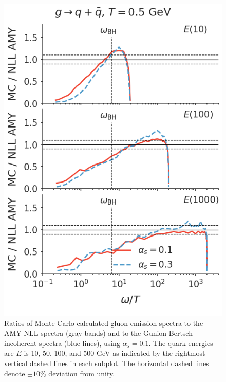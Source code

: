 \documentclass[aps, prc, reprint, amsmath, groupedaddress, nofootinbib]{revtex4-1}
\begin{document}
\begin{appendices}
\begin{figure}
\includegraphics[width=\columnwidth]{spectrum_E_g2qqbar.png}
\caption{Ratios of Monte-Carlo calculated gluon emission spectra to the AMY NLL spectra (gray bands) and to the Gunion-Bertsch incoherent spectra (blue lines), using $\alpha_s = 0.1$. The quark energies are $E$ is 10, 50, 100, and 500 GeV as indicated by the rightmost vertical dashed lines in each subplot. The horizontal dashed lines denote $\pm 10\%$ deviation from unity.}
\label{fig:spectra-alphas=0.1}
\end{figure}


\end{appendices}
\end{document}
